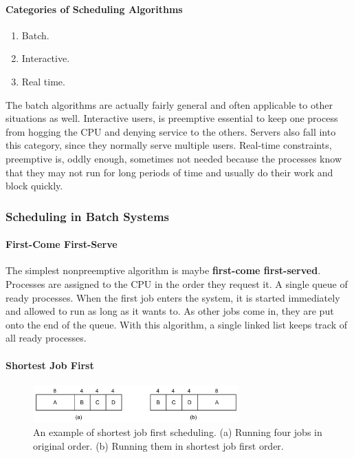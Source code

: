 \documentclass[11pt,a4paper]{article}
\begin{document}
\paragraph{Categories of Scheduling Algorithms}
\begin{enumerate}
\item{Batch.}
\item{Interactive.}
\item{Real time.}
\end{enumerate}

The batch algorithms are actually fairly general and often applicable to other situations as well. Interactive users, is preemptive essential to keep one process from hogging the CPU and denying service to the others. Servers also fall into this category, since they normally serve multiple users. Real-time constraints, preemptive is, oddly enough, sometimes not needed because the processes know that they may not run for long periods of time and usually do their work and block quickly.

\subsubsection{Scheduling in Batch Systems}

\paragraph{First-Come First-Serve}
The simplest nonpreemptive algorithm is maybe \textbf{first-come first-served}. Processes are assigned to the CPU in the order they request it. A single queue of ready processes. When the first job enters the system, it is started immediately and allowed to run as long as it wants to. As other jobs come in, they are put onto the end of the queue. With this algorithm, a single linked list keeps track of all ready processes.

\paragraph{Shortest Job First}
\begin{figure}[h!]
	\centering
		\includegraphics[width=300px]{img/short-01.png}
	\caption{An example of shortest job first scheduling. (a) Running four jobs in original order. (b) Running them in shortest job first order.}
\end{figure}
\end{document}

